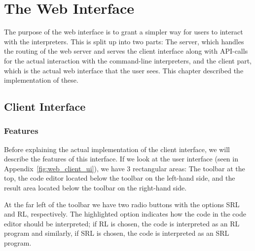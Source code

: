 
\section{The Web Interface}

The purpose of the web interface is to grant a simpler way for users to interact with the interpreters.
This is split up into two parts:
The server, which handles the routing of the web server and serves the client interface along with API-calls for the actual interaction with the command-line interpreters, and the client part, which is the actual web interface that the user sees.
This chapter described the implementation of these.

\subsection{Client Interface}
\label{sec:implementation_web_client}


\subsubsection{Features}

Before explaining the actual implementation of the client interface, we will describe the features of this interface.
If we look at the user interface (seen in Appendix~\ref{fig:web_client_ui}), we have 3 rectangular areas: The toolbar at the top, the code editor located below the toolbar on the left-hand side, and the result area located below the toolbar on the right-hand side.


At the far left of the toolbar we have two radio buttons with the options SRL and RL, respectively. The highlighted option indicates how the code in the code editor should be interpreted; if RL is chosen, the code is interpreted as an RL program and similarly, if SRL is chosen, the code is interpreted as an SRL program.

